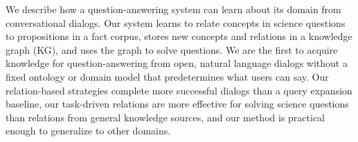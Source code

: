 We describe how a question-answering system can learn about its domain from conversational dialogs. Our system learns to relate concepts in science questions to propositions in a fact corpus, stores new concepts and relations in a knowledge graph (KG), and uses the graph to solve questions. We are the first to acquire knowledge for question-answering from open, natural language dialogs without a fixed ontology or domain model that predetermines what users can say. Our relation-based strategies complete more successful dialogs than a query expansion baseline, our task-driven relations are more effective for solving science questions than relations from general knowledge sources, and our method is practical enough to generalize to other domains.
